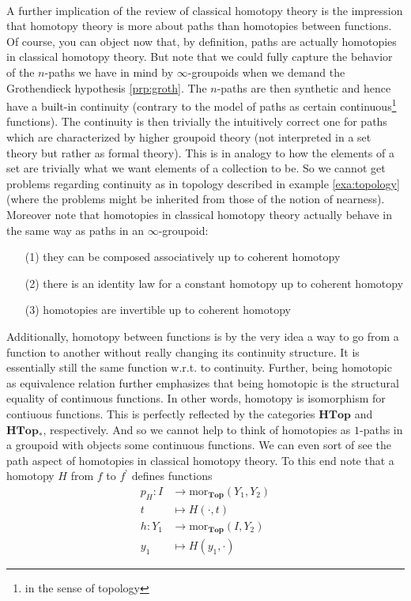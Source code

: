\\
A further implication of the review of classical homotopy theory is the impression that homotopy theory is more about paths than homotopies between functions. Of course, you can object now that, by definition, paths are actually homotopies in classical homotopy theory. But note that we could fully capture the behavior of the $n$-paths we have in mind by $\infty$-groupoids when we demand the Grothendieck hypothesis \ref{prp:groth}. The $n$-paths are then {\glqq}synthetic{\grqq} and hence have a built-in continuity (contrary to the model of paths as certain continuous\footnote{in the sense of topology} functions). The {\glqq}continuity{\grqq} is then trivially the intuitively correct one for paths which are characterized by higher groupoid theory (not interpreted in a set theory but rather as formal theory). This is in analogy to how the elements of a set are trivially what we want elements of a collection to be. So we cannot get problems regarding continuity as in topology described in example \ref{exa:topology} (where the problems might be inherited from those of the notion of nearness). Moreover note that homotopies in classical homotopy theory actually behave in the same way as paths in an $\infty$-groupoid:
\begin{enumerate}
\item[(1)]
they can be composed associatively up to coherent homotopy
\item[(2)]
there is an identity law for a constant homotopy up to coherent homotopy
\item[(3)]
homotopies are invertible up to coherent homotopy
\end{enumerate}
Additionally, homotopy between functions is by the very idea a way to go from a function to another without really changing its continuity structure. It is essentially still the same function w.r.t. to continuity. Further, being homotopic as equivalence relation further emphasizes that being homotopic is the structural equality of continuous functions. In other words, homotopy is isomorphism for contiuous functions. This is perfectly reflected by the categories $\mathbf{HTop}$ and $\mathbf{HTop}_{\ast}$, respectively. And so we cannot help to think of homotopies as $1$-paths in a groupoid with objects some continuous functions. We can even sort of see the path aspect of homotopies in classical homotopy theory. To this end note that a homotopy $H$ from $f$ to $f^{\backprime}$ defines functions
\begin{align*}
  p_{H}
  \colon
  I
  &\rightarrow
  \mathrm{mor}_{\mathbf{Top}}(Y_{1},Y_{2})
  \\
  t
  &\mapsto
  H(\cdot,t)
  \\
  h
  \colon
  Y_{1}
  &\rightarrow
  \mathrm{mor}_{\mathbf{Top}}(I,Y_{2})
  \\
  y_{1}
  &\mapsto
  H(y_{1},\cdot)
\end{align*}

